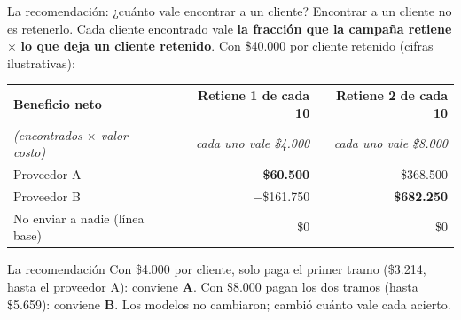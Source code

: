 \documentclass{beamer}
\begin{document}
\begin{frame}{La recomendación: ¿cuánto vale encontrar a un cliente?}
\small
Encontrar a un cliente no es retenerlo. Cada cliente encontrado vale \textbf{la fracción que la campaña retiene} $\times$ \textbf{lo que deja un cliente retenido}. Con \$40.000 por cliente retenido (cifras ilustrativas):

\vspace{0.1cm}
\begin{center}
\scriptsize
\setlength{\tabcolsep}{6pt}
\begin{tabular}{@{}l r r@{}}
\toprule
\textbf{Beneficio neto} & \textbf{Retiene 1 de cada 10} & \textbf{Retiene 2 de cada 10} \\
\textit{(encontrados $\times$ valor $-$ costo)} & \textit{cada uno vale \$4.000} & \textit{cada uno vale \$8.000} \\
\midrule
Proveedor A & \textbf{\$60.500} & \$368.500 \\
Proveedor B & $-$\$161.750 & \textbf{\$682.250} \\
No enviar a nadie (línea base) & \$0 & \$0 \\
\bottomrule
\end{tabular}
\end{center}
\pause
\begin{alertblock}{La recomendación}
Con \$4.000 por cliente, solo paga el primer tramo (\$3.214, hasta el proveedor A): conviene \textbf{A}. Con \$8.000 pagan los dos tramos (hasta \$5.659): conviene \textbf{B}. Los modelos no cambiaron; cambió cuánto vale cada acierto.
\end{alertblock}
\end{frame}
\end{document}
